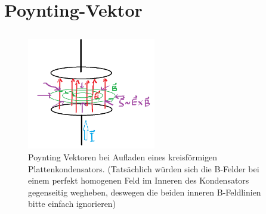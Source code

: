 \documentclass[11pt]{article}
\begin{document}
\section{Poynting-Vektor}
\subsection{}
\begin{figure}[h]
    \centering
    \includegraphics[width=0.5\textwidth]{F1.png}
    \begin{adjustwidth}{20pt}{}
        \caption{Poynting Vektoren bei Aufladen eines kreisförmigen Plattenkondensators.
        (Tatsächlich würden sich die B-Felder bei einem perfekt homogenen Feld 
        im Inneren des Kondensators gegenseitig wegheben, deswegen die 
        beiden inneren B-Feldlinien bitte einfach ignorieren)}
    \end{adjustwidth}
\end{figure}
\end{document}
